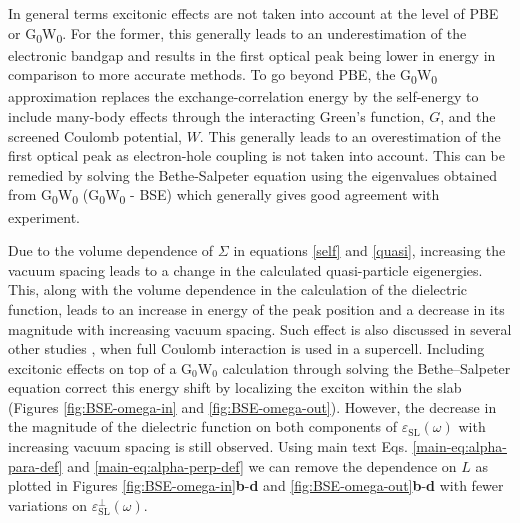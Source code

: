 \documentclass[journal=ancac3,email=true,hyperref=true,keywords=false]{achemso}
\begin{document}
In general terms excitonic effects are not taken into account at the level of PBE or 
G\textsubscript{0}W\textsubscript{0}. 
%
%
%
% 
%
%
For the former, this generally leads to an 
underestimation of the electronic bandgap and results in the first optical peak
being lower in energy in comparison to more accurate methods. 
To go beyond
PBE, the G\textsubscript{0}W\textsubscript{0} approximation
replaces the exchange-correlation energy by the self-energy 
to include many-body effects through the interacting Green's function,
$G$, and the screened Coulomb potential, $W$. 
%
This generally leads to
an overestimation of the first optical peak as electron-hole coupling
is not taken into account. This can be remedied by solving the
Bethe-Salpeter equation using the eigenvalues obtained from
G\textsubscript{0}W\textsubscript{0}
(G\textsubscript{0}W\textsubscript{0} - BSE) which generally gives
good agreement with experiment.

Due to the volume dependence of $\Sigma$ in equations \ref{self} and
\ref{quasi}, increasing the vacuum spacing leads to a change in the
calculated quasi-particle eigenergies. This, along with the volume
dependence in the calculation of the dielectric function, leads to an
increase in energy of the peak position and a decrease in its
magnitude with increasing vacuum spacing. Such effect is also
discussed in several other studies
\cite{Rozzi_2006,Hueser_2013_2Dvs3D}, when full Coulomb interaction is
used in a supercell. Including excitonic effects on top of a
G$_0$W$_0$ calculation through solving the Bethe--Salpeter equation
correct this energy shift by localizing the exciton within the
slab (Figures \ref{fig:BSE-omega-in} and
\ref{fig:BSE-omega-out}). However, the decrease in the magnitude of
the dielectric function on both components of
$\varepsilon_{\mathrm{SL}}(\omega)$ with increasing vacuum spacing is
still observed.  Using main text Eqs. \ref{main-eq:alpha-para-def} and
\ref{main-eq:alpha-perp-def} we can remove the dependence on $L$ as
plotted in Figures \ref{fig:BSE-omega-in}{\bf b}-{\bf d} and
\ref{fig:BSE-omega-out}{\bf b}-{\bf d} with fewer variations on
$\varepsilon^{\perp}_{\mathrm{SL}}(\omega)$.
\end{document}
